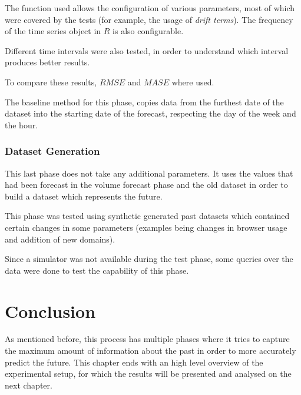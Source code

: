 The function used allows the configuration of various parameters, most of which
were covered by the tests (for example, the usage of \emph{drift terms}).
The frequency of the time series object in
$R$ is also configurable.

Different time intervals were also tested, in order to understand which interval
produces better results.

To compare these results, $RMSE$ and $MASE$ where used.

The baseline method for this phase, copies data from the furthest date of the
dataset into the starting date of the forecast, respecting the day of the week
and the hour.

\subsubsection*{Dataset Generation}

This last phase does not take any additional parameters. It uses the values
that had been forecast in the volume forecast phase and the old dataset in order to build
a dataset which represents the future.

This phase was tested using synthetic generated past datasets which contained certain
changes in some parameters (examples being changes in browser usage and addition
of new domains).

Since a simulator was not available during the test phase, some queries over the
data were done to test the capability of this phase.

\section{Conclusion}

As mentioned before, this process has multiple phases where it tries to capture the
maximum amount of information about the past in order to more accurately predict
the future.
This chapter ends with an high level overview of the experimental setup, for which
the results will be presented and analysed on the next chapter.

